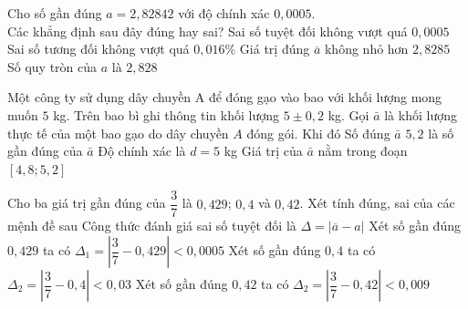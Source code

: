 \begin{ex}%
	Cho  số gần đúng $a=2{,}82842$ với độ chính xác $0{,}0005$. \\
	Các  khẳng định sau đây đúng hay sai?
	 \choiceTF
		{\True Sai số tuyệt đối không vượt quá $0{,}0005$} 
		{\True Sai số tương đối không vượt quá $0{,}016\%$} 
		{Giá trị đúng $\overline{a}$ không  nhỏ hơn $2{,}8285$}
		{\True Số quy tròn của $a$ là  $2{,}828$}
\end{ex}

\begin{ex}%
	Một công ty sử dụng dây chuyền A để đóng gạo  vào bao với khối lượng mong muốn $5$ kg. Trên bao bì ghi thông tin khối lượng $5\pm 0,2$ kg. Gọi $\bar{a}$ là khối lượng thực tế của một bao gạo do dây chuyền $A$ đóng gói. Khi đó
	\choiceTF 
		{\True  Số đúng $\bar{a}$}
		{$5{,}2$  là số gần đúng của $\bar{a}$}
		{Độ chính xác là $ d=5$  kg}
		{\True Giá trị  của $\bar{a}$ nằm trong đoạn $[4,8;5,2]$}
\end{ex}

\begin{ex}%
	Cho ba giá trị gần  đúng của $\dfrac{3}{7}$ là $0{,}429$; $0{,}4$ và $0{,}42$. Xét tính đúng, sai của các mệnh đề sau
	 \choiceTF
		{\True Công thức đánh giá sai số tuyệt  đối là $\Delta=|\overline{a} - a|$}
		{\True Xét số gần đúng $0{,}429$ ta  có $\Delta_1=\left|\dfrac{3}{7} - 0{,}429\right|<0{,}0005$}
		{\True Xét số gần đúng  $0{,}4$ ta có $\Delta_2=\left|\dfrac{3}{7} - 0{,}4\right|<0{,}03$}
		{\True Xét số  gần đúng $0{,}42$ ta có $\Delta_2=\left|\dfrac{3}{7} - 0{,}42\right|<0{,}009$}
\end{ex}

